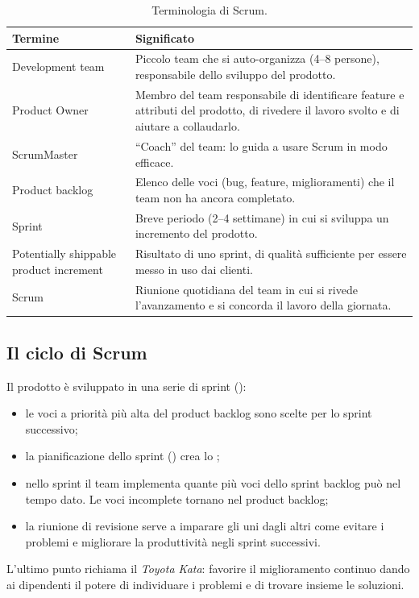 \begin{table}[ht]
\centering
\small
\caption{Terminologia di Scrum.}
\label{tab:agile-scrum}
\begin{tabularx}{\linewidth}{>{\raggedright\arraybackslash}p{4.2cm}X}
\toprule
Termine & Significato \\
\midrule
Development team & Piccolo team che si auto-organizza (4--8 persone), responsabile dello sviluppo del prodotto. \\
Product Owner & Membro del team responsabile di identificare feature e attributi del prodotto, di rivedere il lavoro
  svolto e di aiutare a collaudarlo. \\
ScrumMaster & ``Coach'' del team: lo guida a usare Scrum in modo efficace. \\
Product backlog & Elenco delle voci (bug, feature, miglioramenti) che il team non ha ancora completato. \\
Sprint & Breve periodo (2--4 settimane) in cui si sviluppa un incremento del prodotto. \\
Potentially shippable product increment & Risultato di uno sprint, di qualità sufficiente per essere messo in uso dai
  clienti. \\
Scrum & Riunione quotidiana del team in cui si rivede l'avanzamento e si concorda il lavoro della giornata. \\
\bottomrule
\end{tabularx}
\end{table}

\subsection*{Il ciclo di Scrum}

Il prodotto è sviluppato in una serie di sprint ():
\begin{itemize}
  \item le voci a priorità più alta del product backlog sono scelte per lo sprint successivo;
  \item la pianificazione dello sprint () crea lo ;
  \item nello sprint il team implementa quante più voci dello sprint backlog può nel tempo dato. Le voci incomplete
    tornano nel product backlog;
  \item la riunione di revisione serve a imparare gli uni dagli altri come evitare i problemi e migliorare la
    produttività negli sprint successivi.
\end{itemize}
L'ultimo punto richiama il \emph{Toyota Kata}: favorire il miglioramento continuo dando ai dipendenti il potere di
individuare i problemi e di trovare insieme le soluzioni.

